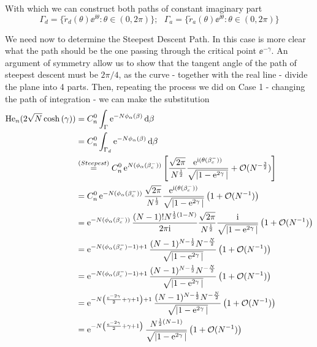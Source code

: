 With which we can construct both paths of constant imaginary part 
\begin{equation}
	\Gamma_d = \{ \tilde{r}_d(\theta) \ee^{\ii \theta} : \theta \in (0, 2\pi) \}; \ \ \ \Gamma_a = \{ \tilde{r}_a(\theta) \ee^{\ii \theta} : \theta \in (0, 2\pi) \} 
\end{equation}


We need now to determine the Steepest Descent Path. In this case is more clear what the path should be the one passing through the critical point $\ee^{-\gamma}$.  An argument of symmetry allow us to show that the tangent angle of the path of steepest descent must be $2\pi/4$, as the curve - together with the real line - divide the plane into 4 parts. Then, repeating the process we did on Case 1 - changing the path of integration - we can make the substitution
\begin{align}
		\mathrm{He}_{n}(2\sqrt{N}\cosh{(\gamma)}) &= C_n^0 \int_{\Gamma}  \operatorname{e}^{-N \phi_\alpha(\beta)} \mathrm{d} \beta \\
		&= C_n^0 \int_{\Gamma_d}  \operatorname{e}^{-N \phi_\alpha(\beta)} \mathrm{d} \beta \\
		& \stackrel{(Steepest)}{=}  C_n^0  \operatorname{e}^{N(\phi_\alpha(\beta_c^-))} 
		\left[
		\frac{\sqrt{2\pi}}{N^{\frac{1}{2}}}
		\frac{\operatorname{e}^{\mathrm{i} (\theta(\beta_c^-))}}{\sqrt{|1 - \operatorname{e}^{2\gamma}|}} 
		+ \mathcal{O}(N^{-\frac{3}{2}})
		\right]
		\\
		&= C_n^0  
		\operatorname{e}^{-N(\phi_\alpha(\beta_c^-))}
		\frac{\sqrt{2\pi}}{N^{\frac{1}{2}}}
		\frac{\operatorname{e}^{\mathrm{i} (\theta(\beta_c^-))}}{\sqrt{|1 - \operatorname{e}^{2\gamma}|}} 
		\left(1 + \mathcal{O}(N^{-1}) \right)
	    \\
		&= 	\operatorname{e}^{-N(\phi_\alpha(\beta_c^-))} \frac{(N-1)! N^{\frac{1}{2}\left(1-N\right)}}{2\pi \mathrm{i}} 
		\frac{\sqrt{2\pi}}{N^{\frac{1}{2}}}
		\frac{\mathrm{i}}{\sqrt{|1 - \operatorname{e}^{2\gamma}|}} 
		\left(1 + \mathcal{O}(N^{-1}) \right)
		\\
		&= 	\operatorname{e}^{-N(\phi_\alpha(\beta_c^-) - 1) + 1} \frac{(N-1)^{N - \frac{1}{2}} N^{-\frac{N}{2}}}{\sqrt{|1 - \operatorname{e}^{2\gamma}|}} 
		\left(1 + \mathcal{O}(N^{-1}) \right)
		\\
		& =	\operatorname{e}^{-N( \phi_\alpha(\beta_c^-) - 1) + 1} \frac{(N-1)^{N - \frac{1}{2}} N^{-\frac{N}{2}}}{\sqrt{|1 - \operatorname{e}^{2\gamma}|}} 
		\left(1 + \mathcal{O}(N^{-1}) \right) \\
		& =	\operatorname{e}^{-N\left( \frac{\operatorname{e}^{-2\gamma}}{2} + \gamma +  1\right) + 1} \frac{(N-1)^{N - \frac{1}{2}} N^{-\frac{N}{2}}}{\sqrt{|1 - \operatorname{e}^{2\gamma}|}} 
		\left(1 + \mathcal{O}(N^{-1}) \right) \\
		& =	\operatorname{e}^{-N\left( \frac{\operatorname{e}^{-2\gamma}}{2} + \gamma +  1\right)} \frac{N^{\frac{1}{2}\left(N - 1\right)}}{\sqrt{|1 - \operatorname{e}^{2\gamma}|}} 
		\left(1 + \mathcal{O}(N^{-1}) \right)
\end{align}
